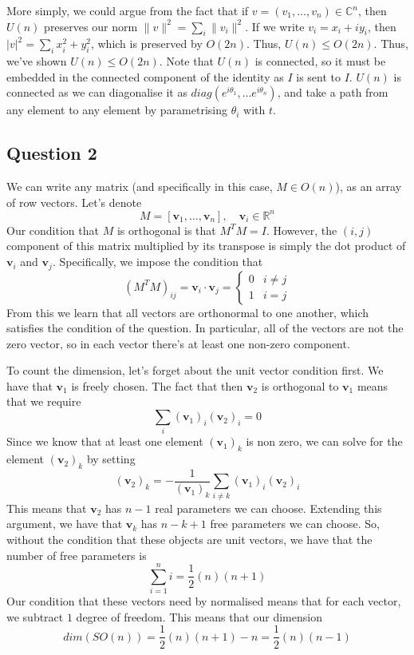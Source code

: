 \documentclass[11pt, oneside]{article}   	%
\theoremstyle{slanted}
\begin{document}
More simply, we could argue from the fact that if $ v = ( v_1 , \dots, v_{ n  }) \in \mathbb{ C} ^ n$, 
then $ U ( n ) $ preserves our norm $ \| v \|^ 2   = \sum_i \| v_ i  \|^ 2  $. 
If we write $ v_{i } = x_ i + i y_ i $, then $ | v| ^ 2 = \sum_i x_i ^ 2 + y_i ^ 2 $, 
which is preserved by  $ O ( 2n ) $. Thus, $ U ( n ) \leq O ( 2n ) $. 
Thus, we've shown $ U ( n ) \leq O ( 2n ) $. 
Note that $ U ( n ) $ is connected, so it must be embedded in the 
connected component of the identity as $ I $ is sent to $ I $. 
$ U ( n ) $ is connected as we can diagonalise it as $ diag ( e^{ i \theta _ 1 }, \dots e^{ i \theta_ n } ) $, 
and take a path from any element to any element by parametrising $ \theta_ i $
with  $ t$. 

\pagebreak

\subsection{Question 2} 
We can write any matrix (and specifically in this case, $ M \in O(n)$), as an array of row vectors. Let's denote 
\[ 
M  = [ \mathbf{v}_1, \dots, \mathbf{v}_n ], \quad \mathbf{v}_i \in \mathbb{R}^n \] 
Our condition that $M$ is orthogonal is that $M^T M = I$. However, the $(i, j)$ component of this matrix multiplied by its transpose is simply the dot product of $\mathbf{v}_i$ and $\mathbf{v}_j$. Specifically, we impose the condition that 
\[ 
(M^T M )_{ ij} = \mathbf{v}_i \cdot \mathbf{v}_j = \begin{cases} 
0 & i \neq j \\
1 & i = j \end{cases} 
\] 
From this we learn that all vectors are orthonormal to one another, which satisfies the condition of the question. In particular, all of the vectors are not the zero vector, so in each vector there's at least one non-zero component.  

To count the dimension, let's forget about the unit vector condition first. We have that $\mathbf{v}_1$ is freely chosen. The fact that then $\mathbf{v}_2$ is orthogonal to $\mathbf{v}_1 $ means that we require 
\[ 
\sum_i ( \mathbf{v}_1)_i ( \mathbf{v}_2)_i = 0
\] Since we know that at least one element $(\mathbf{v}_1)_k$ is non zero, we can solve for the element $( \mathbf{v}_2)_k$ by setting
\[ 
(\mathbf{v}_2)_k =  - \frac{ 1}{ ( \mathbf{v}_1)_k } \sum_{ i \neq k } (\mathbf{ v}_1)_i ( \mathbf{v}_2 )_i 
\] 
This means that $\mathbf{v}_2$ has $n - 1$ real parameters we can choose. Extending this argument, we have that $\mathbf{v}_k $ has $n - k + 1$ free parameters we can choose. So, without the condition that these objects are unit vectors, we have that the number of free parameters is 
\[ 
\sum_{i = 1}^n i  = \frac{1}{2}( n) ( n + 1 ) 
\]  
Our condition that these vectors need by normalised means that for each vector, we subtract $1$ degree of freedom. This means that our dimension 
\[ 
dim ( SO(n ) ) = \frac{1}{2} (n)( n + 1)  - n = \frac{1}{2}(n)( n- 1) 
\] 
\end{document}
